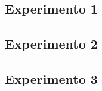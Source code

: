 \documentclass[../main.tex]{subfiles}
\begin{document}
\subsection{Experimento 1}

\subsection{Experimento 2}

\subsection{Experimento 3}
\end{document}

